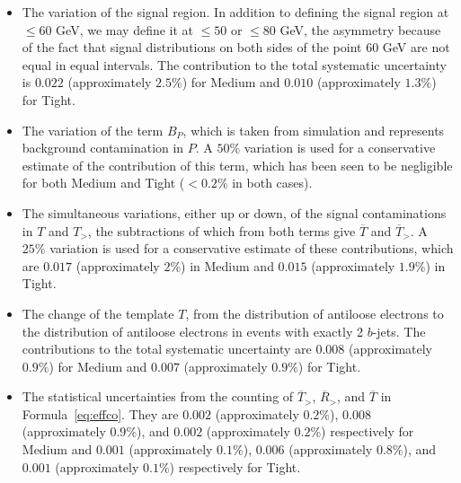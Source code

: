 \begin{itemize}

	\item The variation of the signal region. In addition to defining the signal
	      region at $\leq 60$ GeV, we may define it at $\leq 50$ or $\leq 80$ GeV, the
	      asymmetry because of the fact that signal distributions on both sides of the
	      point $60$ GeV are not equal in equal intervals. The contribution to the total
	      systematic uncertainty is $\mathbf{0.022}$ (approximately $2.5\%$)
	      for Medium and $\mathbf{0.010}$ (approximately $1.3\%$) for Tight.


	\item The variation of the term $B_P$, which is taken from simulation and
	      represents background contamination in $P$. A $50\%$ variation is used for a
	      conservative estimate of the contribution of this term, which has been seen to
	      be negligible for both Medium and Tight ($<0.2\%$ in both cases).


	\item The simultaneous variations, either up or down, of the signal
	      contaminations in $T$ and $T_>$, the subtractions of which from both terms
	      give $\overline{T}$ and $\overline{T}_>$. A $25\%$ variation is used for a
	      conservative estimate of these contributions, which are $\mathbf{0.017}$ (approximately
	      $2\%$) in Medium and $\mathbf{0.015}$ (approximately $1.9\%$) in Tight.

	\item The change of the template $T$, from the distribution of antiloose
	      electrons to the distribution of antiloose electrons in events with exactly 2
	      $b$-jets. The contributions to the total systematic uncertainty are
	      $\mathbf{0.008}$ (approximately $0.9\%$) for Medium and $\mathbf{0.007}$
	      (approximately $0.9\%$) for Tight.


	\item The statistical uncertainties from the counting of $\overline{T}_>$,
	      $\overline{R}_>$, and $\overline{T}$ in Formula~\ref{eq:effco}. They are
	      $0.002$ (approximately $0.2\%$), $0.008$ (approximately $0.9\%$), and $0.002$
	      (approximately $0.2\%$) respectively for Medium and $0.001$ (approximately
	      $0.1\%$), $0.006$ (approximately $0.8\%$), and $0.001$ (approximately $0.1\%$)
	      respectively for Tight.


\end{itemize}


